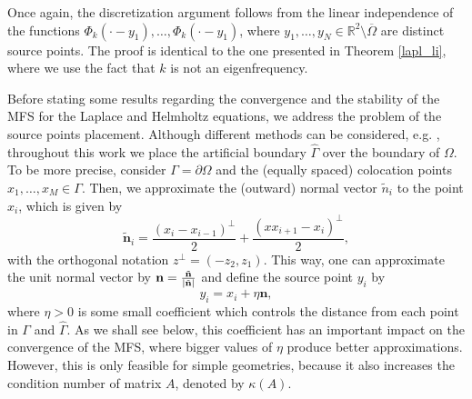 Once again, the discretization argument follows from the linear independence of the functions \(\Phi_k(\cdot-y_1),\dots,\Phi_k(\cdot-y_1)\), where \(y_1,\dots,y_N \in \mathbb{R}^2\setminus\overline{\Omega}\) are distinct source points. The proof is identical to the one presented in Theorem \eqref{lapl_li}, where we use the fact that \(k\) is not an eigenfrequency.

Before stating some results regarding the convergence and the stability of the MFS for the Laplace and Helmholtz equations, we address the problem of the source points placement. Although different methods can be considered, e.g. \cite{alves2009choice}, throughout this work we place the artificial boundary \(\hat{\Gamma}\) over the boundary of \(\Omega\). To be more precise, consider \(\Gamma = \partial \Omega\) and the (equally spaced) colocation points \(x_1,\dots,x_M \in \Gamma\). Then, we approximate the (outward) normal vector \(\tilde{n}_i\) to the point \(x_i\), which is given by
\[
    \tilde{\mathbf{n}}_i = \frac{(x_i - x_{i-1})^\perp }{2} + \frac{(xx_{i+1}-x_i)^\perp }{2},
\]
with the orthogonal notation \(z^\perp = (-z_2,z_1)\). This way, one can approximate the unit normal vector by \(\mathbf{n} = \frac{\tilde{\mathbf{n}}}{\abs{\tilde{\mathbf{n}}}}\) and define the source point \(y_i\) by
\[
    y_i = x_i + \eta \mathbf{n},
\]
where \(\eta>0\) is some small coefficient which controls the distance from each point in \(\Gamma\) and \(\hat{\Gamma}\). As we shall see below, this coefficient has an important impact on the convergence of the MFS, where bigger values of \(\eta\) produce better approximations. However, this is only feasible for simple geometries, because it also increases the condition number of matrix \(A\), denoted by \(\kappa(A)\).

